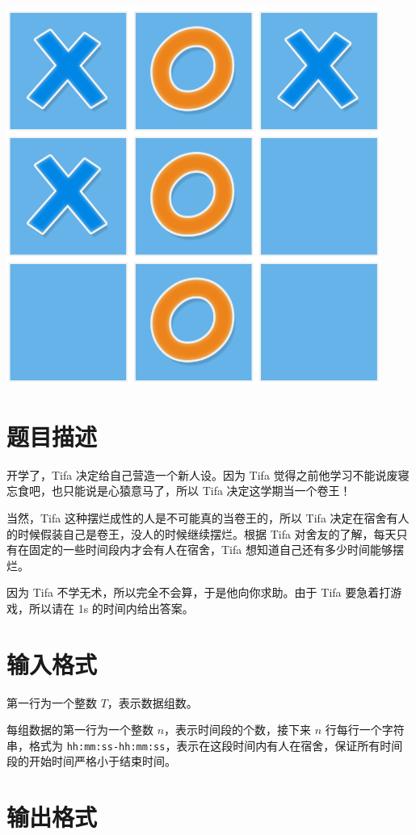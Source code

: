 \documentclass{../cpct/ctpro}
\begin{document}
\includegraphics[scale=0.5]{images/2.png}

\makeproblem
\section*{题目描述}

开学了，Tifa 决定给自己营造一个新人设。因为 Tifa 觉得之前他学习不能说废寝忘食吧，也只能说是心猿意马了，所以 Tifa 决定这学期当一个卷王！

当然，Tifa 这种摆烂成性的人是不可能真的当卷王的，所以 Tifa 决定在宿舍有人的时候假装自己是卷王，没人的时候继续摆烂。根据 Tifa 对舍友的了解，每天只有在固定的一些时间段内才会有人在宿舍，Tifa 想知道自己还有多少时间能够摆烂。

因为 Tifa 不学无术，所以完全不会算，于是他向你求助。由于 Tifa 要急着打游戏，所以请在 1s 的时间内给出答案。

\section*{输入格式}

第一行为一个整数 $T$，表示数据组数。

每组数据的第一行为一个整数 $n$，表示时间段的个数，接下来 $n$ 行每行一个字符串，格式为 \texttt{hh:mm:ss-hh:mm:ss}，表示在这段时间内有人在宿舍，保证所有时间段的开始时间严格小于结束时间。

\section*{输出格式}
\end{document}
